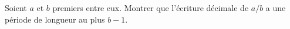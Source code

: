 Soient $a$ et $b$ premiers entre eux. Montrer que l'écriture décimale de $a/b$ a une période de longueur au plus $b - 1$.
